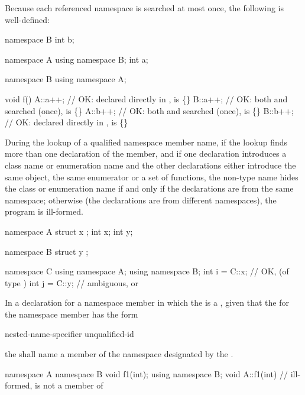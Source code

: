 \pnum
Because each referenced namespace is searched at most once, the
following is well-defined:

\begin{codeblock}
namespace B {
	int b;
}

namespace A {
	using namespace B;
	int a;
}

namespace B {
	using namespace A;
}

void f()
{
	A::a++;			// OK:  declared directly in ,  is \{\}
	B::a++;			// OK: both  and  searched (once),  is \{\}
	A::b++;			// OK: both  and  searched (once),  is \{\}
	B::b++;			// OK:  declared directly in ,  is \{\}
}
\end{codeblock}
\exitexampleb

\pnum
During the lookup of a qualified namespace member name, if the lookup
finds more than one declaration of the member, and if one declaration
introduces a class name or enumeration name and the other declarations
either introduce the same object, the same enumerator or a set of
functions, the non-type name hides the class or enumeration name if and
only if the declarations are from the same namespace; otherwise (the
declarations are from different namespaces), the program is ill-formed.
\enterexample

\begin{codeblock}
namespace A {
	struct x { };
	int x;
	int y;
}

namespace B {
	struct y { };
}

namespace C {
	using namespace A;
	using namespace B;
	int i = C::x;		// OK,  (of type )
	int j = C::y;		// ambiguous,  or 
}
\end{codeblock}
\exitexampleb

\pnum
In a declaration for a namespace member in which the
 is a , given that the
 for the namespace member has the form

\begin{ncbnf}
nested-name-specifier unqualified-id
\end{ncbnf}

the
 shall name a member of the namespace
designated by the .
\enterexample

\begin{codeblock}
namespace A {
	namespace B {
		void f1(int);
	}
	using namespace B;
}
void A::f1(int) { }		// ill-formed,  is not a member of 
\end{codeblock}

